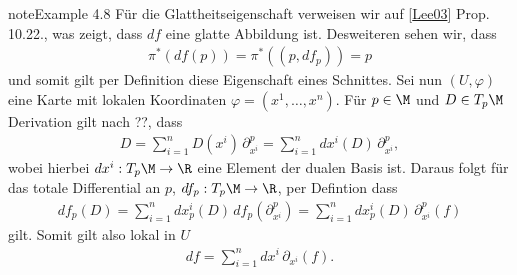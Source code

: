 \documentclass[letterpaper,10pt,english]{jupyterBook}
\begin{document}
\begin{sphinxadmonition}{note}{Example 4.8}
\sphinxAtStartPar
Für die Glattheitseigenschaft verweisen wir auf {[}\hyperlink{cite.references:id15}{Lee03}{]} Prop. 10.22., was zeigt, dass \(df\) eine glatte Abbildung ist. Desweiteren sehen wir, dass
\begin{equation*}
\begin{split}\pi^\ast(df(p)) = \pi^\ast((p,df_p)) = p \end{split}
\end{equation*}
\sphinxAtStartPar
und somit gilt per Definition diese Eigenschaft eines Schnittes. Sei nun \((U,\varphi)\) eine Karte mit lokalen Koordinaten \(\varphi = (x^1,\ldots, x^n)\). Für \(p\in\M\) und \(D\in T_p\M\) Derivation gilt nach ??, dass
\begin{equation*}
\begin{split}D = \sum_{i=1}^n D(x^i)\, \partial_{x^i}^p = \sum_{i=1}^n dx^{i}(D)\, \partial_{x^i}^p,\end{split}
\end{equation*}
\sphinxAtStartPar
wobei hierbei \(dx^{i}:T_p\M\to\R\) eine Element der dualen Basis ist. Daraus folgt für das totale Differential an \(p\), \(df_p:T_p\M\to\R\), per Defintion dass
\begin{equation*}
\begin{split}df_p(D) = \sum_{i=1}^n dx_p^{i}(D)\, df_p(\partial_{x^i}^p) = 
\sum_{i=1}^n dx_p^{i}(D)\, \partial_{x^i}^p(f)\end{split}
\end{equation*}
\sphinxAtStartPar
gilt. Somit gilt also lokal in \(U\)
\begin{equation*}
\begin{split}df = \sum_{i=1}^n dx^{i}\, \partial_{x^i}(f).\end{split}
\end{equation*}\end{sphinxadmonition}
\end{document}
